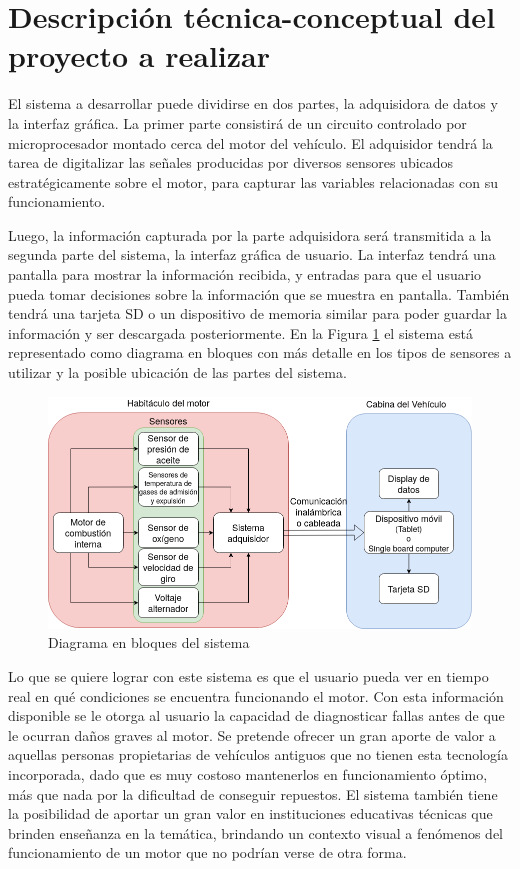 \documentclass[11pt]{charter}
\begin{document}
\section{Descripción técnica-conceptual del proyecto a realizar}
\label{sec:descripcion}

El sistema a desarrollar puede dividirse en dos partes, la adquisidora de datos y la interfaz gráfica. La primer parte consistirá de un circuito controlado por microprocesador montado cerca del motor del vehículo. El adquisidor tendrá la tarea de digitalizar las señales producidas por diversos sensores ubicados estratégicamente sobre el motor, para capturar las variables relacionadas con su funcionamiento. 

Luego, la información capturada por la parte adquisidora será transmitida a la segunda parte del sistema, la interfaz gráfica de usuario. La interfaz tendrá una pantalla para mostrar la información recibida, y entradas para que el usuario pueda tomar decisiones sobre la información que se muestra en pantalla. También tendrá una tarjeta SD o un dispositivo de memoria similar para poder guardar la información y ser descargada posteriormente. En la Figura \ref{fig:diagrama_de_bloques} el sistema está representado como diagrama en bloques con más detalle en los tipos de sensores a utilizar y la posible ubicación de las partes del sistema.

\vspace{25px}

\begin{figure}[htpb]
\centering 
\includegraphics[width=.9\textwidth]{./Figuras/diagrama-proyecto.png}
\caption{Diagrama en bloques del sistema}
\label{fig:diagrama_de_bloques}
\end{figure}

\vspace{25px}

Lo que se quiere lograr con este sistema es que el usuario pueda ver en tiempo real en qué condiciones se encuentra funcionando el motor. Con esta información disponible se le otorga al usuario la capacidad de diagnosticar fallas antes de que le ocurran daños graves al motor. Se pretende ofrecer un gran aporte de valor a aquellas personas propietarias de vehículos antiguos que no tienen esta tecnología incorporada, dado que es muy costoso mantenerlos en funcionamiento óptimo, más que nada por la dificultad de conseguir repuestos. El sistema también tiene la posibilidad de aportar un gran valor en instituciones educativas técnicas que brinden enseñanza en la temática, brindando un contexto visual a fenómenos del funcionamiento de un motor que no podrían verse de otra forma.
\end{document}
